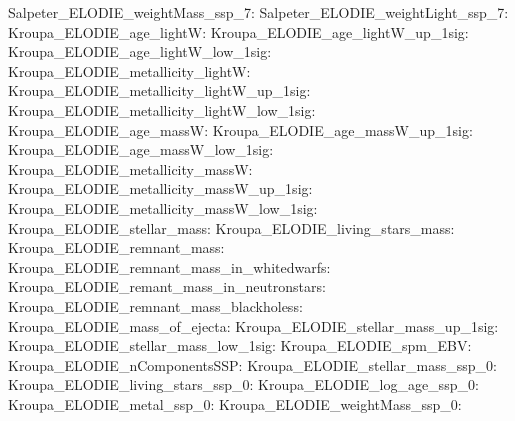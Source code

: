 Salpeter\_ELODIE\_weightMass\_ssp\_7:  \newline 
Salpeter\_ELODIE\_weightLight\_ssp\_7:  \newline 
Kroupa\_ELODIE\_age\_lightW:  \newline 
Kroupa\_ELODIE\_age\_lightW\_up\_1sig:  \newline 
Kroupa\_ELODIE\_age\_lightW\_low\_1sig:  \newline 
Kroupa\_ELODIE\_metallicity\_lightW:  \newline 
Kroupa\_ELODIE\_metallicity\_lightW\_up\_1sig:  \newline 
Kroupa\_ELODIE\_metallicity\_lightW\_low\_1sig:  \newline 
Kroupa\_ELODIE\_age\_massW:  \newline 
Kroupa\_ELODIE\_age\_massW\_up\_1sig:  \newline 
Kroupa\_ELODIE\_age\_massW\_low\_1sig:  \newline 
Kroupa\_ELODIE\_metallicity\_massW:  \newline 
Kroupa\_ELODIE\_metallicity\_massW\_up\_1sig:  \newline 
Kroupa\_ELODIE\_metallicity\_massW\_low\_1sig:  \newline 
Kroupa\_ELODIE\_stellar\_mass:  \newline 
Kroupa\_ELODIE\_living\_stars\_mass:  \newline 
Kroupa\_ELODIE\_remnant\_mass:  \newline 
Kroupa\_ELODIE\_remnant\_mass\_in\_whitedwarfs:  \newline 
Kroupa\_ELODIE\_remant\_mass\_in\_neutronstars:  \newline 
Kroupa\_ELODIE\_remnant\_mass\_blackholess:  \newline 
Kroupa\_ELODIE\_mass\_of\_ejecta:  \newline 
Kroupa\_ELODIE\_stellar\_mass\_up\_1sig:  \newline 
Kroupa\_ELODIE\_stellar\_mass\_low\_1sig:  \newline 
Kroupa\_ELODIE\_spm\_EBV:  \newline 
Kroupa\_ELODIE\_nComponentsSSP:  \newline 
Kroupa\_ELODIE\_stellar\_mass\_ssp\_0:  \newline 
Kroupa\_ELODIE\_living\_stars\_ssp\_0:  \newline 
Kroupa\_ELODIE\_log\_age\_ssp\_0:  \newline 
Kroupa\_ELODIE\_metal\_ssp\_0:  \newline 
Kroupa\_ELODIE\_weightMass\_ssp\_0:  \newline 
